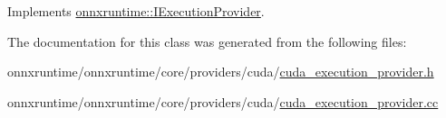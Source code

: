 Implements \mbox{\hyperlink{classonnxruntime_1_1IExecutionProvider_a6bfeb7af172299bcc6083a418b01fac1}{onnxruntime\+::\+I\+Execution\+Provider}}.



The documentation for this class was generated from the following files\+:\begin{DoxyCompactItemize}
\item 
onnxruntime/onnxruntime/core/providers/cuda/\mbox{\hyperlink{cuda__execution__provider_8h}{cuda\+\_\+execution\+\_\+provider.\+h}}\item 
onnxruntime/onnxruntime/core/providers/cuda/\mbox{\hyperlink{cuda__execution__provider_8cc}{cuda\+\_\+execution\+\_\+provider.\+cc}}\end{DoxyCompactItemize}
